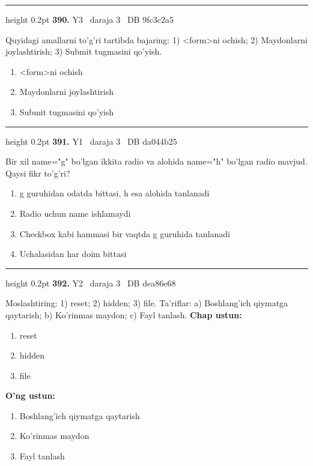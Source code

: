 \documentclass[10pt,a4paper,oneside]{article}
\begin{document}
\vspace{2mm}\hrule height 0.2pt \vspace{4mm}
\hypertarget{q390}{\textbf{\color{ink}390.}}  {\color{muted}\scriptsize Y3 \textbullet\ daraja 3 \textbullet\ DB 9fc3c2a5}
\par
Quyidagi amallarni to'g'ri tartibda bajaring: 1) \textless{}form\textgreater{}ni ochish; 2) Maydonlarni joylashtirish; 3) Submit tugmasini qo'yish.
\begin{enumerate}[label=\Alph*),leftmargin=9mm]
\item \textless{}form\textgreater{}ni ochish
\item Maydonlarni joylashtirish
\item Submit tugmasini qo'yish
\end{enumerate}
\vspace{2mm}\hrule height 0.2pt \vspace{4mm}
\hypertarget{q391}{\textbf{\color{ink}391.}}  {\color{muted}\scriptsize Y1 \textbullet\ daraja 3 \textbullet\ DB da044b25}
\par
Bir xil name="g" bo'lgan ikkita radio va alohida name="h" bo'lgan radio mavjud. Qaysi fikr to'g'ri?
\begin{enumerate}[label=\Alph*),leftmargin=9mm]
\item g guruhidan odatda bittasi, h esa alohida tanlanadi
\item Radio uchun name ishlamaydi
\item Checkbox kabi hammasi bir vaqtda g guruhida tanlanadi
\item Uchalasidan har doim bittasi
\end{enumerate}
\vspace{2mm}\hrule height 0.2pt \vspace{4mm}
\hypertarget{q392}{\textbf{\color{ink}392.}}  {\color{muted}\scriptsize Y2 \textbullet\ daraja 3 \textbullet\ DB dea86e68}
\par
Moslashtiring: 1) reset; 2) hidden; 3) file. Ta'riflar: a) Boshlang'ich qiymatga qaytarish; b) Ko'rinmas maydon; c) Fayl tanlash.
\textbf{\footnotesize Chap ustun:}
\begin{enumerate}[label=\arabic*),leftmargin=9mm]
\item reset
\item hidden
\item file
\end{enumerate}
\textbf{\footnotesize O'ng ustun:}
\begin{enumerate}[label=\Alph*),leftmargin=9mm]
\item Boshlang'ich qiymatga qaytarish
\item Ko'rinmas maydon
\item Fayl tanlash
\end{enumerate}
\end{document}
